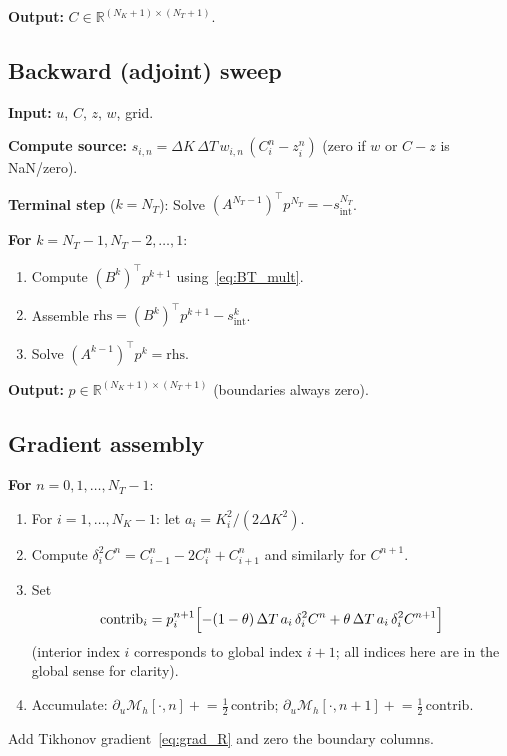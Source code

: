 \documentclass[11pt, a4paper]{article}
\newcommand{\R}{\mathbb{R}}
\newcommand{\dK}{\Delta K}
\newcommand{\dT}{\Delta T}
\theoremstyle{definition}
\theoremstyle{plain}
\begin{document}
\textbf{Output:} $C \in \R^{(N_K+1)\times(N_T+1)}$.

\subsection{Backward (adjoint) sweep}

\textbf{Input:} $u$, $C$, $z$, $w$, grid.

\textbf{Compute source:}
$s_{i,n} = \dK\,\dT\,w_{i,n}\,(C_i^n - z_i^n)$ (zero if $w$ or $C-z$ is NaN/zero).

\textbf{Terminal step} ($k = N_T$):
Solve $(A^{N_T-1})^\top p^{N_T} = -s_\text{int}^{N_T}$.

\textbf{For} $k = N_T - 1, N_T - 2, \ldots, 1$:
\begin{enumerate}
  \item Compute $(B^k)^\top p^{k+1}$ using~\eqref{eq:BT_mult}.
  \item Assemble $\text{rhs} = (B^k)^\top p^{k+1} - s_\text{int}^k$.
  \item Solve $(A^{k-1})^\top p^k = \text{rhs}$.
\end{enumerate}

\textbf{Output:} $p \in \R^{(N_K+1)\times(N_T+1)}$ (boundaries always zero).

\subsection{Gradient assembly}

\textbf{For} $n = 0, 1, \ldots, N_T - 1$:
\begin{enumerate}
  \item For $i = 1, \ldots, N_K - 1$: let $a_i = K_i^2/(2\dK^2)$.
  \item Compute $\delta^2_i C^n = C_{i-1}^n - 2C_i^n + C_{i+1}^n$
    and similarly for $C^{n+1}$.
  \item Set
    \[
      \text{contrib}_i =
        p_{i}^{n+1}
        \Bigl[-(1-\theta)\,\dT\,a_i\,\delta^2_i C^n
              + \theta\,\dT\,a_i\,\delta^2_i C^{n+1}
        \Bigr]
    \]
    (interior index $i$ corresponds to global index $i+1$; all indices here
    are in the global sense for clarity).
  \item Accumulate: $\partial_u \mathcal{M}_h[\cdot, n] \mathrel{+}= \tfrac{1}{2}\,\text{contrib}$;
    $\partial_u \mathcal{M}_h[\cdot, n+1] \mathrel{+}= \tfrac{1}{2}\,\text{contrib}$.
\end{enumerate}

Add Tikhonov gradient~\eqref{eq:grad_R} and zero the boundary columns.
\end{document}
